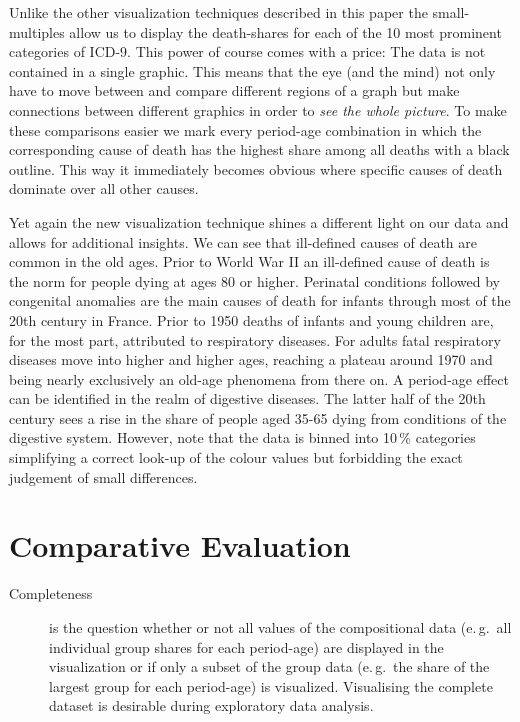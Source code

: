 \documentclass[a4paper, 12pt]{scrartcl}
\begin{document}
Unlike the other visualization techniques described in this paper the small-multiples allow us to display the death-shares for each of the 10 most prominent categories of ICD-9. This power of course comes with a price: The data is not contained in a single graphic. This means that the eye (and the mind) not only have to move between and compare different regions of a graph but make connections between different graphics in order to \emph{see the whole picture}. To make these comparisons easier we mark every period-age combination in which the corresponding cause of death has the highest share among all deaths with a black outline. This way it immediately becomes obvious where specific causes of death dominate over all other causes.

Yet again the new visualization technique shines a different light on our data and allows for additional insights. We can see that ill-defined causes of death are common in the old ages. Prior to World War II an ill-defined cause of death is the norm for people dying at ages 80 or higher. Perinatal conditions followed by congenital anomalies are the main causes of death for infants through most of the 20th century in France. Prior to 1950 deaths of infants and young children are, for the most part, attributed to respiratory diseases. For adults fatal respiratory diseases move into higher and higher ages, reaching a plateau around 1970 and being nearly exclusively an old-age phenomena from there on. A period-age effect can be identified in the realm of digestive diseases. The latter half of the 20th century sees a rise in the share of people aged 35-65 dying from conditions of the digestive system. However, note that the data is binned into 10\,\% categories simplifying a correct look-up of the colour values but forbidding the exact judgement of small differences.

\clearpage

\section{Comparative Evaluation} %
\label{sec:eval}

\begin{description}
  \item[Completeness] is the question whether or not all values of the compositional data (e.\,g.~all individual group shares for each period-age) are displayed in the visualization or if only a subset of the group data (e.\,g.~the share of the largest group for each period-age) is visualized. Visualising the complete dataset is desirable during exploratory data analysis.
\end{description}
\end{document}
